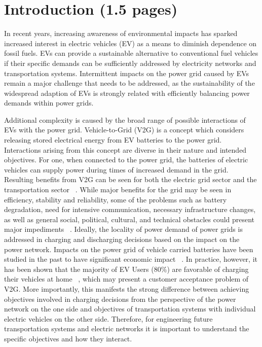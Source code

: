 \section{Introduction (1.5 pages)}

In recent years, increasing awareness of environmental impacts has sparked increased interest in electric vehicles (EV) as a means to diminish dependence on fossil fuels. EVs can provide a sustainable alternative to conventional fuel vehicles if their specific demands can be sufficiently addressed by electricity networks and transportation systems.
Intermittent impacts on the power grid caused by EVs remain a major challenge that needs to be addressed, as the sustainability of the widespread adaption of EVs is strongly related with efficiently balancing power demands within power grids. 

Additional complexity is caused by the broad range of possible interactions of EVs with the power grid. Vehicle-to-Grid (V2G) is a concept which considers releasing stored electrical energy from EV batteries to the power grid. Interactions arising from this concept are diverse in their nature and intended objectives. For one, when connected to the power grid, the batteries of electric vehicles can supply power during times of increased demand in the grid. Resulting benefits from V2G can be seen for both the electric grid sector and the transportation sector ~\cite{tomic2007using}. While major benefits for the grid may be seen in efficiency, stability and reliability, some of the problems such as battery degradation, need for intensive communication, necessary infrastructure changes, as well as general social, political, cultural, and technical obstacles could present major impediments ~\cite{yilmaz2013review}. Ideally, the locality of power demand of power grids is addressed in charging and discharging decisions based on the impact on the power network. Impacts on the power grid of vehicle carried batteries have been studied in the past to have significant economic impact ~\cite{peterson2010economics,erdinc2014economic}. In practice, however, it has been shown that the majority of EV Users (80\%) are favorable of charging their vehicles at home ~\cite{haines2009simulation}, which may present a customer acceptance problem of V2G. 
More importantly, this manifests the strong difference between achieving objectives involved in charging decisions from the perspective of the power network on the one side and objectives of transportation systems with individual electric vehicles on the other side. 
Therefore, for engineering future transportation systems and electric networks it is important to understand the specific objectives and how they interact.

